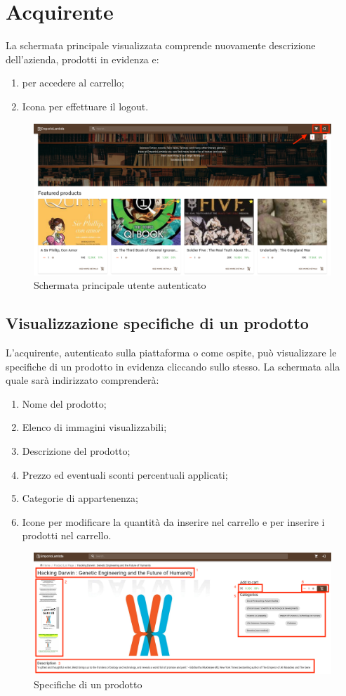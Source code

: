 \section{Acquirente}\label{Acquirente}
La schermata principale visualizzata comprende nuovamente descrizione dell'azienda, prodotti in evidenza e:
\begin{enumerate}
	\item {} per accedere al carrello;
	\item Icona per effettuare il logout.
\end{enumerate} 
\begin{figure}[H]
	\centering
	\includegraphics[scale=0.25]{Immagini/Acquirente/home.customer.png}
	\caption{Schermata principale utente autenticato}
	\label{fig:Homecustomer}
\end{figure}
\subsection{Visualizzazione specifiche di un prodotto}
L'acquirente, autenticato sulla piattaforma o come ospite, può visualizzare le specifiche di un prodotto in evidenza cliccando sullo stesso. La schermata alla quale sarà indirizzato comprenderà:
\begin{enumerate}
	\item Nome del prodotto;
	\item Elenco di immagini visualizzabili;
	\item Descrizione del prodotto;
	\item Prezzo ed eventuali sconti percentuali applicati;
	\item Categorie di appartenenza;
	\item Icone per modificare la quantità da inserire nel carrello e per inserire i prodotti nel carrello.
\end{enumerate} 
\begin{figure}[H]
	\centering
	\includegraphics[scale=0.25]{Immagini/Acquirente/pdp.customer.png}
	\caption{Specifiche di un prodotto}
	\label{fig:SpecificheProdotto}
\end{figure}
